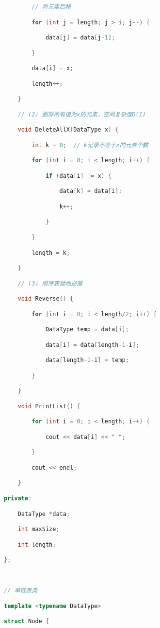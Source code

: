 \begin{lstlisting}[language=C++]
        // 将元素后移

        for (int j = length; j > i; j--) {

            data[j] = data[j-1];

        }

        data[i] = x;

        length++;

    }

    // (2) 删除所有值为x的元素，空间复杂度O(1)

    void DeleteAllX(DataType x) {

        int k = 0;  // k记录不等于x的元素个数

        for (int i = 0; i < length; i++) {

            if (data[i] != x) {

                data[k] = data[i];

                k++;

            }

        }

        length = k;

    }

    // (3) 顺序表就地逆置

    void Reverse() {

        for (int i = 0; i < length/2; i++) {

            DataType temp = data[i];

            data[i] = data[length-1-i];

            data[length-1-i] = temp;

        }

    }

    void PrintList() {

        for (int i = 0; i < length; i++) {

            cout << data[i] << " ";

        }

        cout << endl;

    }

private:

    DataType *data;

    int maxSize;

    int length;

};

  

// 单链表类

template <typename DataType>

struct Node {


\end{lstlisting}
